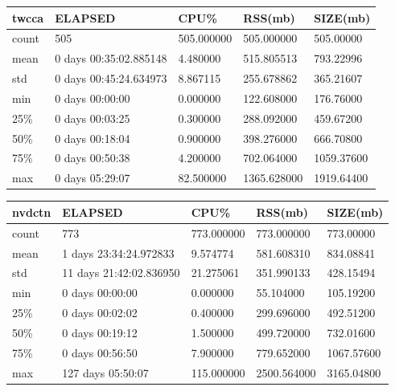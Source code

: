 \documentclass{article}
\begin{document}
\begin{tabular}{|l|l|l|l|l|}
\hline 
\hline twcca& ELAPSED&   CPU\%&  RSS(mb)&   SIZE(mb) \\
\hline count&    505& 505.000000&  505.000000&  505.00000 \\
\hline mean&  0 days 00:35:02.885148&  4.480000&  515.805513&  793.22996 \\
\hline std&  0 days 00:45:24.634973&  8.867115&  255.678862&  365.21607 \\
\hline min&   0 days 00:00:00&  0.000000&  122.608000&  176.76000 \\
\hline 25\%&   0 days 00:03:25&  0.300000&  288.092000&  459.67200 \\
\hline 50\%&   0 days 00:18:04&  0.900000&  398.276000&  666.70800 \\
\hline 75\%&   0 days 00:50:38&  4.200000&  702.064000& 1059.37600 \\
\hline max&   0 days 05:29:07&  82.500000& 1365.628000& 1919.64400 \\
\hline 
\end{tabular}
 
\begin{tabular}{|l|l|l|l|l|}
\hline 
\hline nvdctn&    ELAPSED&   CPU\%&  RSS(mb)&   SIZE(mb) \\
\hline count&   773& 773.000000&  773.000000&  773.00000 \\
\hline mean&  1 days 23:34:24.972833&  9.574774&  581.608310&  834.08841 \\
\hline std&  11 days 21:42:02.836950&  21.275061&  351.990133&  428.15494 \\
\hline min&   0 days 00:00:00&  0.000000&  55.104000&  105.19200 \\
\hline 25\%&   0 days 00:02:02&  0.400000&  299.696000&  492.51200 \\
\hline 50\%&   0 days 00:19:12&  1.500000&  499.720000&  732.01600 \\
\hline 75\%&   0 days 00:56:50&  7.900000&  779.652000& 1067.57600 \\
\hline max&  127 days 05:50:07& 115.000000& 2500.564000& 3165.04800 \\
\hline 
\end{tabular}
 
\end{document}
